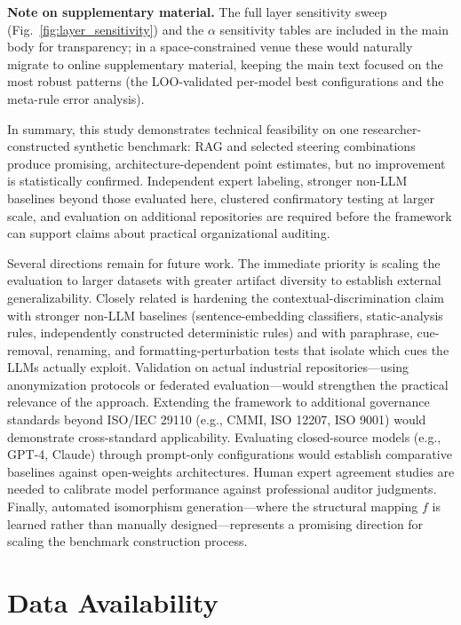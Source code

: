 \documentclass{ieeeaccess}
\begin{document}
\textbf{Note on supplementary material.} The full layer sensitivity sweep (Fig.~\ref{fig:layer_sensitivity}) and the $\alpha$ sensitivity tables are included in the main body for transparency; in a space-constrained venue these would naturally migrate to online supplementary material, keeping the main text focused on the most robust patterns (the LOO-validated per-model best configurations and the meta-rule error analysis).

In summary, this study demonstrates technical feasibility on one researcher-constructed synthetic benchmark: RAG and selected steering combinations produce promising, architecture-dependent point estimates, but no improvement is statistically confirmed. Independent expert labeling, stronger non-LLM baselines beyond those evaluated here, clustered confirmatory testing at larger scale, and evaluation on additional repositories are required before the framework can support claims about practical organizational auditing.

Several directions remain for future work. The immediate priority is scaling the evaluation to larger datasets with greater artifact diversity to establish external generalizability. Closely related is hardening the contextual-discrimination claim with stronger non-LLM baselines (sentence-embedding classifiers, static-analysis rules, independently constructed deterministic rules) and with paraphrase, cue-removal, renaming, and formatting-perturbation tests that isolate which cues the LLMs actually exploit. Validation on actual industrial repositories---using anonymization protocols or federated evaluation---would strengthen the practical relevance of the approach. Extending the framework to additional governance standards beyond ISO/IEC 29110 (e.g., CMMI, ISO 12207, ISO 9001) would demonstrate cross-standard applicability. Evaluating closed-source models (e.g., GPT-4, Claude) through prompt-only configurations would establish comparative baselines against open-weights architectures. Human expert agreement studies are needed to calibrate model performance against professional auditor judgments. Finally, automated isomorphism generation---where the structural mapping $f$ is learned rather than manually designed---represents a promising direction for scaling the benchmark construction process.


\section*{Data Availability}
\end{document}
